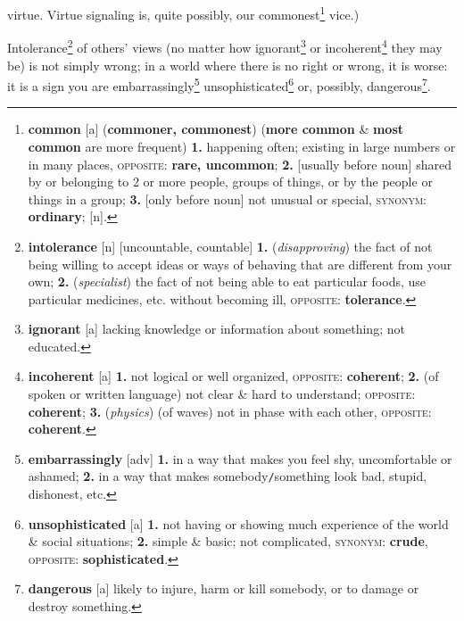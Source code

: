 \documentclass[oneside]{book}
\numberwithin{equation}{section}
\begin{document}
virtue. Virtue signaling is, quite possibly, our commonest\footnote{\textbf{common} [a] (\textbf{commoner, commonest}) (\textbf{more common} \& \textbf{most common} are more frequent) \textbf{1.} happening often; existing in large numbers or in many places, \textsc{opposite}: \textbf{rare, uncommon}; \textbf{2.} [usually before noun] shared by or belonging to 2 or more people, groups of things, or by the people or things in a group; \textbf{3.} [only before noun] not unusual or special, \textsc{synonym}: \textbf{ordinary}; [n].} vice.)

Intolerance\footnote{\textbf{intolerance} [n] [uncountable, countable] \textbf{1.} (\textit{disapproving}) the fact of not being willing to accept ideas or ways of behaving that are different from your own; \textbf{2.} (\textit{specialist}) the fact of not being able to eat particular foods, use particular medicines, etc. without becoming ill, \textsc{opposite}: \textbf{tolerance}.} of others' views (no matter how ignorant\footnote{\textbf{ignorant} [a] lacking knowledge or information about something; not educated.} or incoherent\footnote{\textbf{incoherent} [a] \textbf{1.} not logical or well organized, \textsc{opposite}: \textbf{coherent}; \textbf{2.} (of spoken or written language) not clear \& hard to understand; \textsc{opposite}: \textbf{coherent}; \textbf{3.} (\textit{physics}) (of waves) not in phase with each other, \textsc{opposite}: \textbf{coherent}.} they may be) is not simply wrong; in a world where there is no right or wrong, it is worse: it is a sign you are embarrassingly\footnote{\textbf{embarrassingly} [adv] \textbf{1.} in a way that makes you feel shy, uncomfortable or ashamed; \textbf{2.} in a way that makes somebody\texttt{/}something look bad, stupid, dishonest, etc.} unsophisticated\footnote{\textbf{unsophisticated} [a] \textbf{1.} not having or showing much experience of the world \& social situations; \textbf{2.} simple \& basic; not complicated, \textsc{synonym}: \textbf{crude}, \textsc{opposite}: \textbf{sophisticated}.} or, possibly, dangerous\footnote{\textbf{dangerous} [a] likely to injure, harm or kill somebody, or to damage or destroy something.}.
\end{document}
